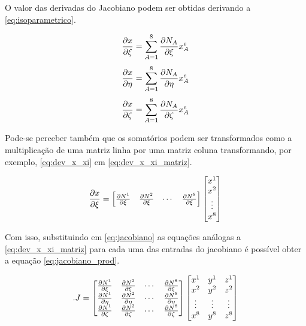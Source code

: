 O valor das derivadas do Jacobiano podem ser obtidas derivando a \ref{eq:isoparametrico}.


\begin{equation}\label{eq:dev_x_xi}
\dxi[x] = \sum^8_{A=1} \dxi[N_A] x^e_A
\end{equation}
\begin{equation}
\deta[x] = \sum^8_{A=1} \deta[N_A] x^e_A
\end{equation}
\begin{equation}
\dzeta[x] = \sum^8_{A=1} \dzeta[N_A] x^e_A
\end{equation}



Pode-se perceber também que os somatórios podem ser transformados como a multiplicação de uma matriz linha por uma matriz coluna transformando, por exemplo, \ref{eq:dev_x_xi} em \ref{eq:dev_x_xi_matriz}.

\begin{equation}\label{eq:dev_x_xi_matriz}
\dxi[x] =
\begin{bmatrix}
 \dxi[N^1]   & \dxi[N^2] & \cdots & \dxi[N^8]
\end{bmatrix}
\begin{bmatrix}
x^1    \\
x^2    \\
\vdots  \\
x^8
\end{bmatrix}
\end{equation}

Com isso, substituindo em \ref{eq:jacobiano} as equações análogas a \ref{eq:dev_x_xi_matriz} para cada uma das entradas do jacobiano é possível obter a equação \ref{eq:jacobiano_prod}.


\begin{equation}\label{eq:jacobiano_prod}.
J = \der
\begin{bmatrix}
x^1 & y^1 & z^1 \\
x^2 & y^2 & z^2 \\
\vdots & \vdots  & \vdots  \\
x^8 & y^8 & z^8 \\
\end{bmatrix}
\end{equation}


